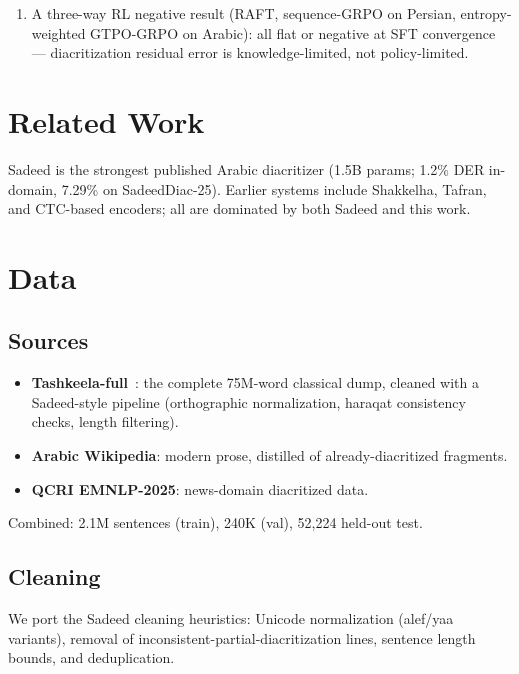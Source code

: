 \documentclass[11pt]{article}
\begin{document}
\begin{enumerate}
        (multi-token-prediction auxiliary level with control and far
        from its gate; register swap $+0.72$pp; register add flat
        against news-only training; on-policy GKD $+1.43$pp over the
        rung it was meant to improve, the worst measured) showing that
        neither frontier-training techniques, register mixing in
        either direction, nor on-policy exposure substitute
        for supervision quality.
  \item A three-way RL negative result (RAFT, sequence-GRPO on Persian,
        entropy-weighted GTPO-GRPO on Arabic): all flat or negative at
        SFT convergence --- diacritization residual error is
        knowledge-limited, not policy-limited.
\end{enumerate}

\section{Related Work}
Sadeed \cite{sadeed} is the strongest published Arabic diacritizer
(1.5B params; 1.2\% DER in-domain, 7.29\% on SadeedDiac-25). Earlier
systems include Shakkelha, Tafran, and CTC-based encoders; all are
dominated by both Sadeed and this work.

\section{Data}
\subsection{Sources}
\begin{itemize}
  \item \textbf{Tashkeela-full}~\cite{tashkeela}: the complete 75M-word classical dump,
        cleaned with a Sadeed-style pipeline (orthographic normalization,
        haraqat consistency checks, length filtering).
  \item \textbf{Arabic Wikipedia}: modern prose, distilled of
        already-diacritized fragments.
  \item \textbf{QCRI EMNLP-2025}: news-domain diacritized data.
\end{itemize}
Combined: 2.1M sentences (train), 240K (val), 52,224 held-out test.

\subsection{Cleaning}
We port the Sadeed cleaning heuristics: Unicode normalization (alef/yaa
variants), removal of inconsistent-partial-diacritization lines, sentence
length bounds, and deduplication.
\end{document}
